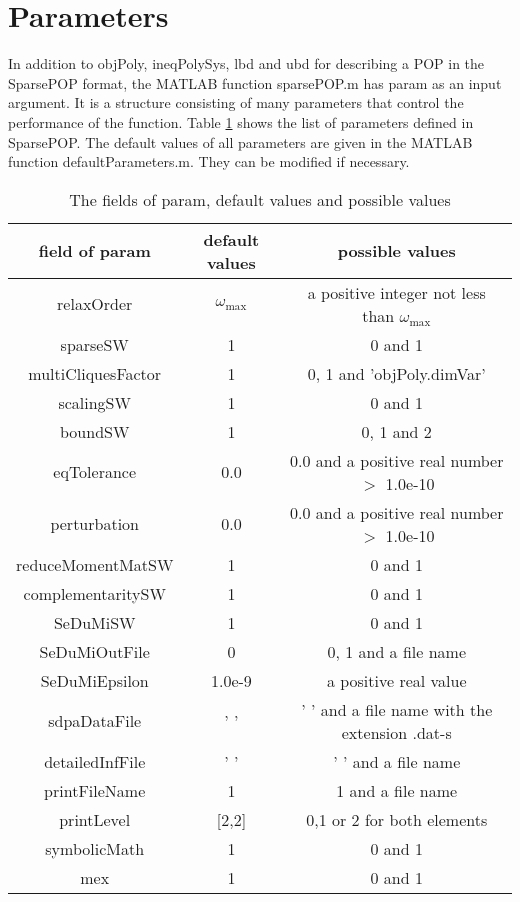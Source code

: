 \section{Parameters}
\label{PARAM}
In addition to {\sf objPoly}, {\sf ineqPolySys}, {\sf lbd} and {\sf ubd} for  describing a POP in the
SparsePOP format, the MATLAB
function sparsePOP.m has {\sf param} as an input argument. It is a structure consisting of
many parameters that control the performance of the function. Table \ref{tableOfparam}
shows the list of parameters defined in SparsePOP. The default values of all parameters are given in the
MATLAB function defaultParameters.m. They can be modified if necessary.

\begin{table}[htdp]
\caption{The fields of {\sf param}, default values and possible values}
\begin{center}
\begin{tabular}{c|c|c}
field of {\sf param} & default values &  possible values\\
\hline
{\sf relaxOrder} & $\omega_{\max}$ & a positive integer not less than $\omega_{\max}$\\
{\sf sparseSW} & 1 & 0 and 1\\
{\sf multiCliquesFactor} & 1 & 0, 1 and 'objPoly.dimVar' \\
{\sf scalingSW} & 1 & 0 and 1\\
{\sf boundSW} & 1 & 0, 1 and 2\\
{\sf eqTolerance} & 0.0 & 0.0 and a positive real number $>$  1.0e-10\\
{\sf perturbation} & 0.0 & 0.0 and a positive real number $>$ 1.0e-10 \\
{\sf reduceMomentMatSW} & 1 & 0 and 1\\
{\sf complementaritySW} & 1 & 0 and 1\\
{\sf SeDuMiSW} & 1 & 0 and 1\\
{\sf SeDuMiOutFile} & 0 & 0, 1 and a file name\\
{\sf SeDuMiEpsilon} & 1.0e-9 & a positive real value\\
{\sf sdpaDataFile} & {\sf ' '} & {\sf ' '} and a file name with the extension .dat-s\\
{\sf detailedInfFile} & {\sf ' '} & {\sf ' '} and a file name\\
{\sf printFileName} & 1 & 1 and a file name\\
{\sf printLevel} & {\sf [}2,2{\sf ]} & 0,1 or 2 for both elements \\
{\sf symbolicMath} & 1& 0 and 1\\
{\sf mex} & 1 & 0 and 1\\
\hline
\end{tabular}
\end{center}
\label{tableOfparam}
\end{table}
